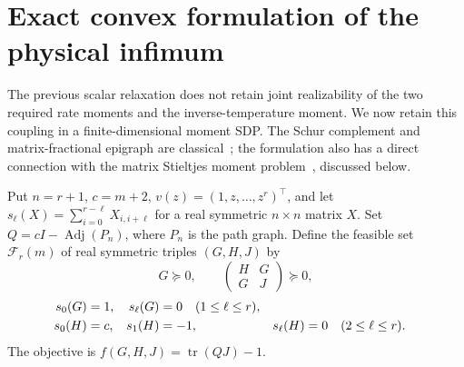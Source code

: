 \documentclass[11pt]{article}
\begin{document}
\section{Exact convex formulation of the physical infimum}
The previous scalar relaxation does not retain joint realizability of the two required rate moments and the inverse-temperature moment. We now retain this coupling in a finite-dimensional moment SDP. The Schur complement and matrix-fractional epigraph are classical~\cite{boyd,burke2019}; the formulation also has a direct connection with the matrix Stieltjes moment problem~\cite{adamyan,zalar2026}, discussed below.

Put $n=r+1$, $c=m+2$, $v(z)=(1,z,\ldots,z^r)^\top$, and let $s_\ell(X)=\sum_{i=0}^{r-\ell}X_{i,i+\ell}$ for a real symmetric $n\times n$ matrix $X$. Set $Q=cI-\operatorname{Adj}(P_n)$, where $P_n$ is the path graph. Define the feasible set $\mathcal F_r(m)$ of real symmetric triples $(G,H,J)$ by
\begin{equation}\label{sdpcone}
G\succeq0,\qquad \begin{pmatrix}H&G\\G&J\end{pmatrix}\succeq0,
\end{equation}
\begin{align}
 s_0(G)&=1, & s_\ell(G)&=0\quad(1\le\ell\le r),\notag\\
 s_0(H)&=c, & s_1(H)&=-1, & s_\ell(H)&=0\quad(2\le\ell\le r).\label{sdplags}
\end{align}
The objective is $f(G,H,J)=\operatorname{tr}(QJ)-1$.
\end{document}
